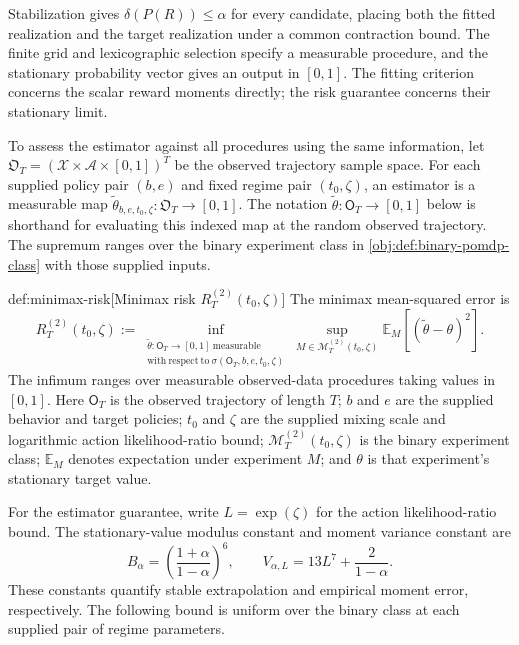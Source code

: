 \documentclass[11pt]{article}
\begin{document}
Stabilization gives \(\delta(P(R))\leq\alpha\) for every candidate, placing both the fitted realization and the target realization under a common contraction bound. The finite grid and lexicographic selection specify a measurable procedure, and the stationary probability vector  gives an output in \([0,1]\). The fitting criterion concerns the scalar reward moments directly; the risk guarantee concerns their stationary limit.

To assess the estimator against all procedures using the same information, let \(\mathfrak O_T=(\mathcal X\times\mathcal A\times[0,1])^T\) be the observed trajectory sample space. For each supplied policy pair \((b,e)\) and fixed regime pair \((t_0,\zeta)\), an estimator is a measurable map \(\widetilde\theta_{b,e,t_0,\zeta}\colon\mathfrak O_T\to[0,1]\). The notation \(\widetilde\theta\colon\mathsf O_T\to[0,1]\) below is shorthand for evaluating this indexed map at the random observed trajectory. The supremum ranges over the binary experiment class in \cref{obj:def:binary-pomdp-class} with those supplied inputs.

\begin{definitionv}{def:minimax-risk}[Minimax risk $R_T^{(2)}(t_0,\zeta)$]
The minimax mean-squared error is
\[
R_T^{(2)}(t_0,\zeta)
:=
\inf_{\substack{\widetilde\theta\colon \mathsf O_T\to[0,1]\ \mathrm{measurable}\\
\mathrm{with\ respect\ to}\ \sigma(\mathsf O_T,b,e,t_0,\zeta)}}
\sup_{M\in\mathcal M_T^{(2)}(t_0,\zeta)}
\mathbb E_M\!\left[(\widetilde\theta-\theta)^2\right].
\]
The infimum ranges over measurable observed-data procedures taking values in \( [0,1] \). Here \(\mathsf O_T\) is the observed trajectory of length \(T\); \(b\) and \(e\) are the supplied behavior and target policies; \(t_0\) and \(\zeta\) are the supplied mixing scale and logarithmic action likelihood-ratio bound; \(\mathcal M_T^{(2)}(t_0,\zeta)\) is the binary experiment class; \(\mathbb E_M\) denotes expectation under experiment \(M\); and \(\theta\) is that experiment's stationary target value.
\end{definitionv}

For the estimator guarantee, write \(L=\exp(\zeta)\) for the action likelihood-ratio bound. The stationary-value modulus constant  and moment variance constant  are
\[
B_\alpha=\left(\frac{1+\alpha}{1-\alpha}\right)^6,
\qquad
V_{\alpha,L}=13L^7+\frac{2}{1-\alpha}.
\]
These constants quantify stable extrapolation and empirical moment error, respectively. The following bound is uniform over the binary class at each supplied pair of regime parameters.
\end{document}
